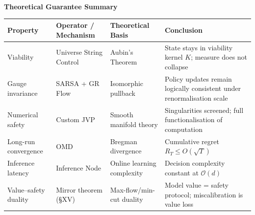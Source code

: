 \documentclass[11pt,a4paper]{article}
\theoremstyle{definition}
\theoremstyle{remark}
\begin{document}
\begin{abstract}
This appendix formalises the Transformer architecture and its application to non-smooth legged robot dynamics within the framework of agentic calculus. We show that self-attention performs a min-cut search over a directed acyclic graph (DAG) while layer normalisation realises a phase operator that satisfies Aubin's tangential condition $F(x) \cap T_K(x) \neq \emptyset$. To handle environmental uncertainties we develop a Universe String Control protocol, combining macro-level finite state machines with micro-level trajectory optimisation and online mirror descent. Theoretical analysis proves that under multi-universe sampling the cumulative regret grows at most $O(\sqrt{T})$ and that the XLA-level inference routine can be executed in constant time. Our contributions lie in recasting Transformer modules as viability-preserving operators, deriving rigorous geometric proofs of their necessity, integrating risk-sensitive control, group renormalisation and formal verification into a unified control framework, and establishing the Mirror theorem: the value of a trained model is the exact dual of its safety protocol under max-flow/min-cut duality.
\end{abstract}

\bigskip

\noindent\textbf{Theoretical Guarantee Summary}

\begin{table}[H]
\centering
\small
\begin{tabularx}{\textwidth}{l l l X}
\toprule
\textbf{Property} & \textbf{Operator / Mechanism} & \textbf{Theoretical Basis} & \textbf{Conclusion} \\
\midrule
Viability & Universe String Control & Aubin's Theorem & State stays in viability kernel $K$; measure does not collapse \\
Gauge invariance & SARSA + GR Flow & Isomorphic pullback & Policy updates remain logically consistent under renormalisation scale \\
Numerical safety & Custom JVP & Smooth manifold theory & Singularities screened; full functionalisation of computation \\
Long-run convergence & OMD & Bregman divergence & Cumulative regret $R_T \leq O(\sqrt{T})$ \\
Inference latency & Inference Node & Online learning complexity & Decision complexity constant at $\mathcal{O}(d)$ \\
Value--safety duality & Mirror theorem (\S XV) & Max-flow/min-cut duality & Model value = safety protocol; miscalibration is value loss \\
\bottomrule
\end{tabularx}
\end{table}
\end{document}
